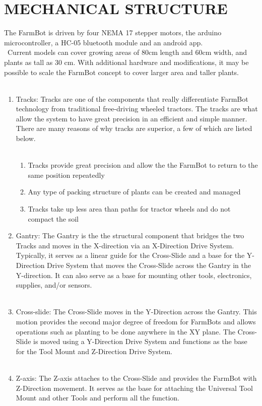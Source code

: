 \documentclass[12pt,a4paper]{report}
\begin{document}
\chapter{MECHANICAL STRUCTURE}
\hspace*{1cm}The FarmBot  is driven by four NEMA 17 stepper motors, the arduino microcontroller, a HC-05 bluetooth module and an android app.\\\
\hspace*{1cm}Current models can cover growing areas of 80cm length and 60cm width, and plants as tall as 30 cm. With additional hardware and modifications, it may be possible to scale the FarmBot concept to cover larger area and taller plants.\\\
\begin{enumerate}
 
\item 	Tracks:
\hspace*{1cm}Tracks are one of the components that really differentiate FarmBot technology from traditional free-driving wheeled tractors. The tracks are what allow the system to have great precision in an efficient and simple manner. There are many reasons of why tracks are superior, a few of which are listed below.\\\
\begin{enumerate}
\item	Tracks provide great precision and allow the the FarmBot to return to the same position repeatedly
\item   Any type of packing structure of plants can be created and managed
\item	Tracks take up less area than paths for tractor wheels and do not compact the soil

 \end{enumerate}
\item 	Gantry:
\hspace*{1cm}The Gantry is the the structural component that bridges the two Tracks and moves in the X-direction via an X-Direction Drive System. Typically, it serves as a linear guide for the Cross-Slide and a base for the Y-Direction Drive System that moves the Cross-Slide across the Gantry in the Y-direction. It can also serve as a base for mounting other tools, electronics, supplies, and/or sensors.\\\
\item 	Cross-slide:
\hspace*{1cm}The Cross-Slide moves in the Y-Direction across the Gantry. This motion provides the second major degree of freedom for FarmBots and allows operations such as planting to be done anywhere in the XY plane. The Cross-Slide is moved using a Y-Direction Drive System and functions as the base for the Tool Mount and Z-Direction Drive System.\\\
\item 	Z-axis:
\hspace*{1cm}The Z-axis attaches to the Cross-Slide and provides the FarmBot with Z-Direction movement. It serves as the base for attaching the Universal Tool Mount and other Tools and perform all the function.\\\

\end{enumerate}
\end{document}
